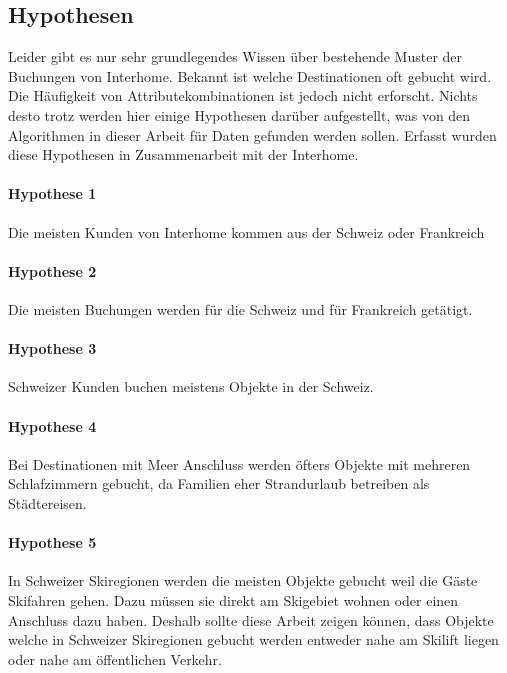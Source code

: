 \subsection{Hypothesen}
Leider gibt es nur sehr grundlegendes Wissen über bestehende Muster der Buchungen von Interhome. Bekannt ist welche Destinationen oft gebucht wird. Die Häufigkeit von Attributekombinationen ist jedoch nicht erforscht. Nichts desto trotz werden hier einige Hypothesen darüber aufgestellt, was von den Algorithmen in dieser Arbeit für Daten gefunden werden sollen. Erfasst wurden diese Hypothesen in Zusammenarbeit mit der Interhome.

\paragraph{Hypothese 1} Die meisten Kunden von Interhome kommen aus der Schweiz oder Frankreich
\paragraph{Hypothese 2} Die meisten Buchungen werden für die Schweiz und für Frankreich getätigt.
\paragraph{Hypothese 3} Schweizer Kunden buchen meistens Objekte in der Schweiz.
\paragraph{Hypothese 4} Bei Destinationen mit Meer Anschluss werden öfters Objekte mit mehreren Schlafzimmern gebucht, da Familien eher Strandurlaub betreiben als Städtereisen.
\paragraph{Hypothese 5} In Schweizer Skiregionen werden die meisten Objekte gebucht weil die Gäste Skifahren gehen. Dazu müssen sie direkt am Skigebiet wohnen oder einen Anschluss dazu haben. Deshalb sollte diese Arbeit zeigen können, dass Objekte welche in Schweizer Skiregionen gebucht werden entweder nahe am Skilift liegen oder nahe am öffentlichen Verkehr.

